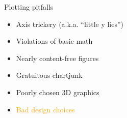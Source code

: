 \documentclass[
  ignorenonframetext,
]{beamer}
\providecommand{\tightlist}{%
  \setlength{\itemsep}{0pt}\setlength{\parskip}{0pt}}
\begin{document}
\begin{frame}{}
\label{section-24}
\end{frame}

\begin{frame}{}
\label{section-25}
\end{frame}

\begin{frame}{Plotting pitfalls}
\label{plotting-pitfalls-5}
\begin{itemize}
\tightlist
\item
  Axis trickery (a.k.a. ``little y lies'')
\item
  Violations of basic math
\item
  Nearly content-free figures
\item
  Gratuitous chartjunk
\item
  Poorly chosen 3D graphics
\item
  \textcolor{orange}{Bad design choices}
\end{itemize}
\end{frame}
\end{document}
